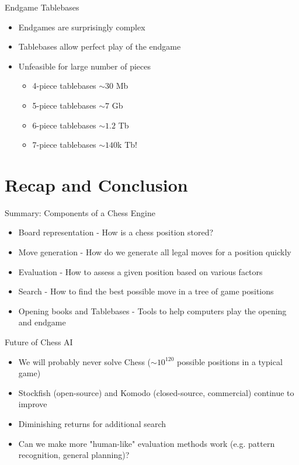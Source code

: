 \documentclass[xcolor=pdftex,dvipsnames,table]{beamer}
\begin{document}
\begin{frame}{Endgame Tablebases}
\begin{itemize}
\item Endgames are surprisingly complex
\item Tablebases allow perfect play of the endgame
\item Unfeasible for large number of pieces
  \begin{itemize}
  \item[\textbullet] 4-piece tablebases $\sim 30$ Mb
  \item[\textbullet] 5-piece tablebases $\sim 7$ Gb
  \item[\textbullet] 6-piece tablebases $\sim 1.2$ Tb
  \item[\textbullet] 7-piece tablebases $\sim 140$k Tb!
  \end{itemize}
\end{itemize}
\end{frame}

\section{Recap and Conclusion}

\begin{frame}{Summary: Components of a Chess Engine}
\begin{itemize}
\item Board representation - How is a chess position stored?
\item Move generation - How do we generate all legal moves for a position quickly
\item Evaluation - How to assess a given position based on various factors
\item Search - How to find the best possible move in a tree of game positions
\item Opening books and Tablebases - Tools to help computers play the opening and endgame
\end{itemize}
\end{frame}

\begin{frame}{Future of Chess AI}
\begin{itemize}
\item We will probably never solve Chess ($\sim 10^{120}$ possible positions in a typical game)
\item Stockfish (open-source) and Komodo (closed-source, commercial) continue to improve
\item Diminishing returns for additional search
\item Can we make more "human-like" evaluation methods work (e.g. pattern recognition, general planning)?
\end{itemize}
\end{frame}
\end{document}
